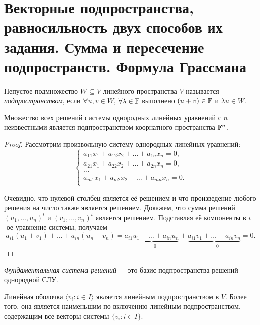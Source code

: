 \section{Векторные подпространства, равносильность двух способов их задания. Сумма и пересечение подпространств. Формула Грассмана}

\begin{definition}
    Непустое подмножество $W \subseteq V$ линейного пространства $V$ называется \textit{подпространством}, если $\forall u, v \in W$, $\forall \lambda \in \mathbb{F}$ выполнено $(u + v) \in \mathbb{F}$ и $\lambda u \in W$.
\end{definition}

\begin{proposal}
    Множество всех решений системы однородных линейных уравнений с $n$ неизвестными является подпространством коорнатного пространства $\mathbb{F}^n$.
\end{proposal}

\begin{proof}
    Рассмотрим произвольную систему однородных линейных уравнений:
    \[
        \begin{cases}
            a_{11}x_1 + a_{12}x_2 + \ldots + a_{1n}x_n = 0,\\
            a_{21}x_1 + a_{22}x_2 + \ldots + a_{2n}x_n = 0,\\
            \ldots\\
            a_{m1}x_1 + a_{m2}x_2 + \ldots + a_{mn}x_n = 0.\\
        \end{cases}
    \]

    Очевидно, что нулевой столбец является её решением и что произведение любого решения на число также является решением. Докажем, что сумма решений $(u_1, \ldots, u_n)^t$ и $(v_1, \ldots, v_n)^t$ является решением. Подставляя её компоненты в $i$-ое уравнение системы, получаем
    \[
        a_{i1}(u_1 + v_1) + \ldots + a_{in}(u_n + v_n) = \underbrace{a_{i1}u_1 + \ldots + a_{in}u_n}_{= 0} + \underbrace{a_{i1}v_1 + \ldots + a_{in}v_n}_{= 0} = 0.
    \]
\end{proof}

\begin{definition}
    \textit{Фундаментальная система решений} --- это базис подпространства решений однородной СЛУ.
\end{definition}

\begin{proposal}
    Линейная оболочка $\langle v_i : i \in I \rangle$ является линейным подпространством в $V$. Более того, она является наименьшим по включению линейным подпространством, содержащим все векторы системы $\{v_i : i \in I\}$.
\end{proposal}

